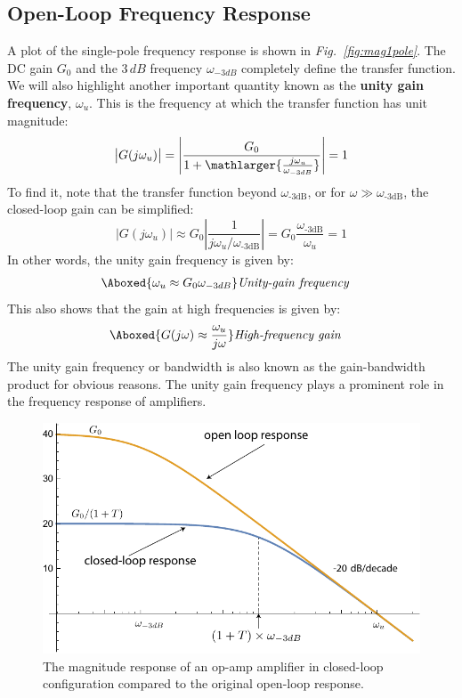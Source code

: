 \subsection{Open-Loop Frequency Response}
A plot of the single-pole frequency response is shown in \emph{Fig.~\ref{fig:mag1pole}}.  The DC gain $G_0$ and the $3\,dB$ frequency $\omega_{-3dB}$ completely define the transfer function.  We will also highlight another important quantity known as the \textbf{unity gain frequency}, $\omega_u$.  This is the frequency at which the transfer function has unit magnitude:
    \begin{equation}
        \big|G(j\omega_u)\big| =
            \left|\frac{G_0}{1 + \mathlarger{\frac{j\omega_u}{\omega_{-3dB}}}} \right| = 1
    \end{equation}
To find it, note that the transfer function beyond $\omega_{\text{-3dB}}$, or for $\omega \gg \omega_{\text{-3dB}}$, the closed-loop gain can be simplified:
    \begin{equation}
        |G(j\omega_u )| \approx G_0 \left| \frac{1}{j\omega_u/\omega_{\text{-3dB}}} \right| = G_0 \frac{\omega_{\text{-3dB}}}{\omega_u} = 1 
    \end{equation}
In other words, the unity gain frequency is given by:
    \begin{align}
        \Aboxed{\omega_u \approx G_0 \omega_{-3dB}}
        &\textit{Unity-gain frequency}
        \label{eq:unity_gain_freq}
    \end{align}  
This also shows that the gain at high frequencies is given by:
    \begin{align}
        \Aboxed{G(j\omega) \approx \frac{\omega_u}{j\omega}}
        &\textit{High-frequency gain}
        \label{eq:high_freq_gain}
    \end{align}
The unity gain frequency or bandwidth is also known as the gain-bandwidth product for obvious reasons.   The unity gain frequency plays a prominent role in the frequency response of amplifiers.
\newpage
\begin{figure}[t]
\centering
\includegraphics[width=.85\columnwidth]{mag1pole_fb}
\caption{The magnitude response of an op-amp amplifier in closed-loop configuration compared to the original open-loop response.}
\label{fig:mag1pole_fb}
\end{figure}

